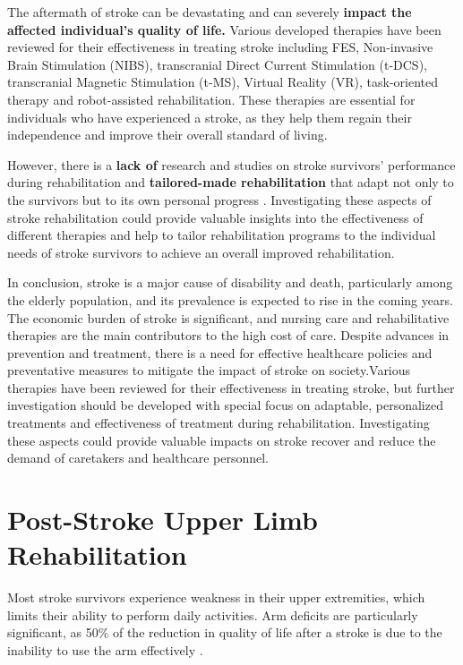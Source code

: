 The aftermath of stroke can be devastating and can severely \textbf{impact the affected individual's quality of life.} Various developed therapies have been reviewed for their effectiveness in treating stroke including FES, Non-invasive Brain Stimulation (NIBS), transcranial Direct Current Stimulation (t-DCS), transcranial Magnetic Stimulation (t-MS), Virtual Reality (VR), task-oriented therapy and robot-assisted rehabilitation. These therapies are essential for individuals who have experienced a stroke, as they help them regain their independence and improve their overall standard of living.

However, there is a \textbf{lack of} research and studies on stroke survivors' performance during rehabilitation and \textbf{tailored-made rehabilitation} that adapt not only to the survivors but to its own personal progress \cite{Ismail2018}. Investigating these aspects of stroke rehabilitation could provide valuable insights into the effectiveness of different therapies and help to tailor rehabilitation programs to the individual needs of stroke survivors to achieve an overall improved rehabilitation.

In conclusion, stroke is a major cause of disability and death, particularly among the elderly population, and its prevalence is expected to rise in the coming years. The economic burden of stroke is significant, and nursing care and rehabilitative therapies are the main contributors to the high cost of care. Despite advances in prevention and treatment, there is a need for effective healthcare policies and preventative measures to mitigate the impact of stroke on society.Various therapies have been reviewed for their effectiveness in treating stroke, but further investigation should be developed with special focus on adaptable, personalized treatments and effectiveness of treatment during rehabilitation. Investigating these aspects could provide valuable impacts on stroke recover and reduce the demand of caretakers and healthcare personnel. 

\section{Post-Stroke Upper Limb Rehabilitation}

Most stroke survivors experience weakness in their upper extremities, which limits their ability to perform daily activities. Arm deficits are particularly significant, as 50\% of the reduction in quality of life after a stroke is due to the inability to use the arm effectively \cite{UEFSS}. 

